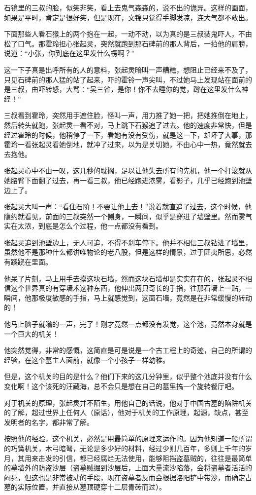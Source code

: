 石镜里的三叔的脸，似笑非笑，看上去鬼气森森的，说不出的诡异。这样的画面，如果是平时，肯定是很好笑，但是现在，文锦只觉得手脚发凉，连大气都不敢出。

下面那些人看石猴上的两个抱在一起，一动不动，以为真的是三叔装鬼吓人，不由松了口气。那霍玲担心张起灵，突然就跑到那石碑前的那人背后，一拍他的肩膀，说道：“小张，你到底在这里发什么楞啊？”

这一下子真是出呼所有的人的意料，张起灵暗叫一声糟糕，想阻止已经来不及了，只见石碑前的那人猛的站了起来，吓的霍铃一声尖叫，不过她马上发现站在面前的是三叔，由吓转怒，大骂：“吴三省，是你！你不去睡你的觉，蹲在这里发什么神经！”

三叔看到霍玲，突然用手遮住脸，怪叫一声，用力推了她一把，把她推倒在地上，然后转头就跑，张起灵一看不对，马上跳下石猴追了过去。他的速度非常快，但是经过霍玲的时候，他稍停了一下，看她有没有受伤，就是这一下，却坏了大事，那霍玲一看张起灵看她倒地，就冲了过来，以为是关切她，不由心中一热，竟然就去去抱他。

张起灵心中不由一叹，这几秒的耽搁，足以让他失去所有的先机，他一个打滚就从她胳臂下面翻了过去，再一看三叔，他已经跑进浓雾，看影子，几乎已经跑到池壁边上了。

张起灵大叫一声：“看住石阶！不要让他上去！”说着就直追了过去，这个时候，他隐约就看见，前面的三叔突然一个侧身，一瞬间，似乎是穿进了墙壁里。然而雾气实在太浓，到底是怎么个过程，他一点都没有看到。

张起灵追到池壁边上，无人可追，不得不刹车停下。他并不相信三叔钻进了墙里，虽然他不是那种什么都讲唯物论的老八股，但是这样的情景，过于匪夷所思，必然有蹊跷在里面。

他呆了片刻，马上用手去摸这块石墙，然而这块石墙却是实实在在的，张起灵不相信这个世界真的有穿墙术这种东西，他伸出两只奇长的手指，往那石墙上一贴，一瞬间，他那极度敏感的手指，马上就感觉到，这面石墙，竟然是在非常缓慢的转动的！

他马上脑子就嗡的一声，完了！刚才竟然一点都没有发觉，这个池，竟然本身就是一个巨大的机关！

他突然觉得，非常的感慨，这简直是可是说是一个古工程上的奇迹，自己的所谓的经验，在这个墓主人面前，就像一个小孩子一样幼稚。

但是，这个机关的目的是什么？他们下来的这几分钟里，似乎整个池底并没有什么变化啊！这个该死的汪藏海，总不会只是想在自己的墓里搞一个旋转餐厅吧。

对于机关的原理，张起灵并不陌生，用他自己的话说，他对于中国古墓的陷阱机关的了解，超过世界上任何人（原话），他对于机关的工作原理，起源，缺点，甚至发明者的名字，都非常了解。

按照他的经验，这个机关，必然是用最简单的原理来运作的。因为他知道一般所谓的巧簧机关，木弓暗弩，无论是多少好的材料，经过少则几百年，多则上千年的岁月，其用来击发的引信，都已经腐烂无法使用，能够阻挡盗墓贼的，往往是最简单的墓墙外的防盗沙层（盗墓贼掘到沙层后，上面大量流沙陷落，会将盗墓者活活的闷死，但这也是非常被动的手段，现在盗墓者反而会根据洛阳铲中带沙，而确定古墓的实际位置，并直接从墓顶硬穿十二层青砖而过）。

